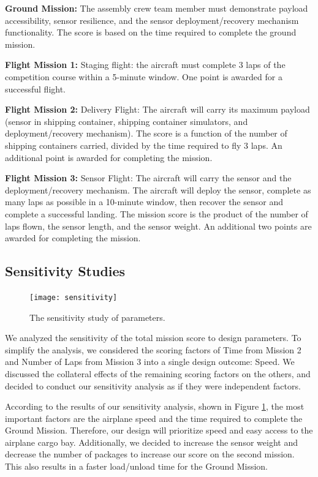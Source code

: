 \documentclass[proposal]{byu-aero}
\begin{document}
\noindent \textbf{Ground Mission:} The assembly crew team member must demonstrate payload accessibility, sensor resilience, and the sensor deployment/recovery mechanism functionality. The score is based on the time required to complete the ground mission. 

\noindent \textbf{Flight Mission 1:} Staging flight: the aircraft must complete 3 laps of the competition course within a 5-minute window. One point is awarded for a successful flight. 

\noindent \textbf{Flight Mission 2:} Delivery Flight: The aircraft will carry its maximum payload (sensor in shipping container, shipping container simulators, and deployment/recovery mechanism). The score is a function of the number of shipping containers carried, divided by the time required to fly 3 laps. An additional point is awarded for completing the mission. 

\noindent \textbf{Flight Mission 3:} Sensor Flight: The aircraft will carry the sensor and the deployment/recovery mechanism. The aircraft will deploy the sensor, complete as many laps as possible in a 10-minute window, then recover the sensor and complete a successful landing. The mission score is the product of the number of laps flown, the sensor length, and the sensor weight. An additional two points are awarded for completing the mission.

\subsection{Sensitivity Studies}
\label{ssec:sensitivitystudies}

\begin{figure}
	\centering
	\vspace*{-10pt}
	\texttt{[image: sensitivity]}
	\caption{The sensitivity study of parameters.}
	\label{fig:Sensitivity Analysis}
\end{figure}
We analyzed the sensitivity of the total mission score to design parameters. To simplify the analysis, we considered the scoring factors of Time from Mission 2 and Number of Laps from Mission 3 into a single design outcome: Speed. We discussed the collateral effects of the remaining scoring factors on the others, and decided to conduct our sensitivity analysis as if they were independent factors.

According to the results of our sensitivity analysis, shown in Figure \ref{fig:Sensitivity Analysis}, the most important factors are the airplane speed and the time required to complete the Ground Mission. Therefore, our design will prioritize speed and easy access to the airplane cargo bay. Additionally, we decided to increase the sensor weight and decrease the number of packages to increase our score on the second mission. This also results in a faster load/unload time for the Ground Mission.
\end{document}
